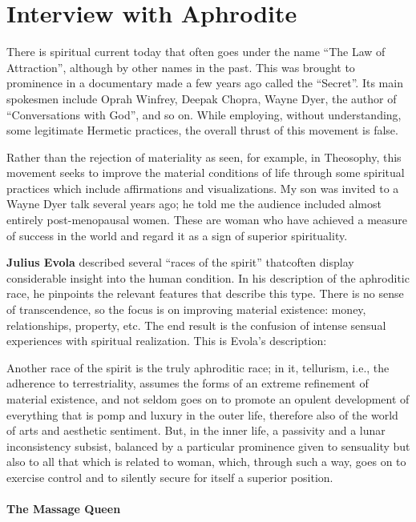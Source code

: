 \section{Interview with Aphrodite}

There is spiritual current today that often goes under the name ``The Law of Attraction'', although by other names in the past. This was brought to prominence in a documentary made a few years ago called the ``Secret''. Its main spokesmen include Oprah Winfrey, Deepak Chopra, Wayne Dyer, the author of ``Conversations with God'', and so on. While employing, without understanding, some legitimate Hermetic practices, the overall thrust of this movement is false.

Rather than the rejection of materiality as seen, for example, in Theosophy, this movement seeks to improve the material conditions of life through some spiritual practices which include affirmations and visualizations. My son was invited to a Wayne Dyer talk several years ago; he told me the audience included almost entirely post-menopausal women. These are woman who have achieved a measure of success in the world and regard it as a sign of superior spirituality.

\textbf{Julius Evola} described several ``races of the spirit'' thatcoften display considerable insight into the human condition. In his description of the aphroditic race, he pinpoints the relevant features that describe this type. There is no sense of transcendence, so the focus is on improving material existence: money, relationships, property, etc. The end result is the confusion of intense sensual experiences with spiritual realization. This is Evola's description:

\begin{quotex}
Another race of the spirit is the truly aphroditic race; in it, tellurism, i.e., the adherence to terrestriality, assumes the forms of an extreme refinement of material existence, and not seldom goes on to promote an opulent development of everything that is pomp and luxury in the outer life, therefore also of the world of arts and aesthetic sentiment. But, in the inner life, a passivity and a lunar inconsistency subsist, balanced by a particular prominence given to sensuality but also to all that which is related to woman, which, through such a way, goes on to exercise control and to silently secure for itself a superior position.
\end{quotex}


\paragraph{The Massage Queen}


